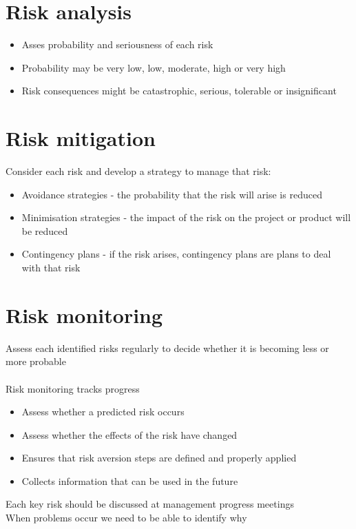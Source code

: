 \documentclass{article}[18pt]
\begin{document}
\section{Risk analysis}
\begin{itemize}
	\item Asses probability and seriousness of each risk
	\item Probability may be very low, low, moderate, high or very high
	\item Risk consequences might be catastrophic, serious, tolerable or insignificant
\end{itemize}
\section{Risk mitigation}
Consider each risk and develop a strategy to manage that risk:
\begin{itemize}
	\item Avoidance strategies - the probability that the risk will arise is reduced
	\item Minimisation strategies - the impact of the risk on the project or product will be reduced
	\item Contingency plans - if the risk arises, contingency plans are plans to deal with that risk
\end{itemize}
\section{Risk monitoring}
Assess each identified risks regularly to decide whether it is becoming less or more probable\\
\\
Risk monitoring tracks progress
\begin{itemize}
	\item Assess whether a predicted risk occurs
	\item Assess whether the effects of the risk have changed
	\item Ensures that risk aversion steps are defined and properly applied
	\item Collects information that can be used in the future
\end{itemize}
Each key risk should be discussed at management progress meetings\\
When problems occur we need to be able to identify why
\end{document}
